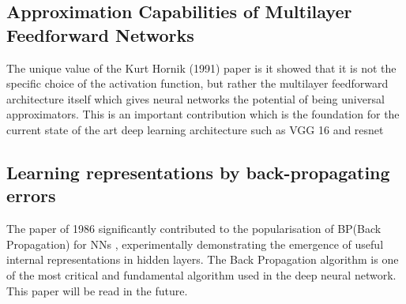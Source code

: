 \documentclass[a4paper,12pt]{article}
\begin{document}
\subsection{Approximation Capabilities of Multilayer Feedforward Networks \cite{hornik1991} }

The unique value of the Kurt Hornik (1991) \cite{hornik1991} paper is it showed that it is not the specific choice of the activation function, but rather the multilayer feedforward architecture itself which gives neural networks the potential of being universal approximators. This is an important contribution which is the foundation for the current state of the art deep learning architecture such as VGG 16  \cite{SimonyanZ14a} and resnet \cite{DBLP:journals/corr/HeZRS15}




\subsection{Learning representations by back-propagating errors\cite{Rumelhart1986}}
The paper of 1986 significantly contributed to the popularisation of BP(Back Propagation) for NNs \cite{Rumelhart1986}, experimentally demonstrating the emergence of useful internal representations in hidden layers. The Back Propagation algorithm is one of the most critical and fundamental algorithm used in the deep neural network.
This paper will be read in the future.\\
\end{document}
